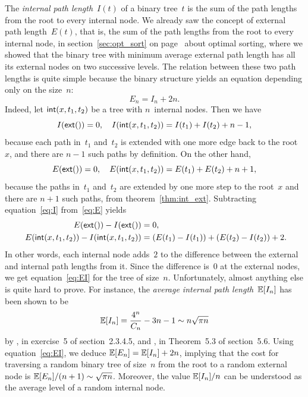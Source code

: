 The \emph{internal path length}~\(I(t)\) of a binary tree~\(t\) is the sum of the path lengths
from the root to every internal node. We already saw the concept of
external path length~\(E(t)\),
that is, the sum of the path lengths from the root to every internal
node, in section~\ref{sec:opt_sort} on page~\pageref{sec:opt_sort}
about optimal sorting, where we showed that the binary tree with
minimum average external path length has all its external nodes on two
successive levels. The relation between these two path lengths is
quite simple because the binary structure yields an equation depending
only on the size~\(n\):
\begin{equation}
E_n = I_n + 2n.\label{eq:EI}
\end{equation}
Indeed, let \(\textsf{int}(x,t_1,t_2)\) be a tree with \(n\)~internal
nodes. Then we have
\begin{equation}
  I(\textsf{ext}()) = 0,\quad
  I(\textsf{int}(x,t_1,t_2)) = I(t_1) + I(t_2) + n - 1,
\label{eq:I}
\end{equation}
because each path in~\(t_1\) and~\(t_2\) is extended with one more
edge back to the root~\(x\), and there are \(n-1\) such paths by
definition. On the other hand,
\begin{equation}
  E(\textsf{ext}()) = 0,\quad
  E(\textsf{int}(x,t_1,t_2)) = E(t_1) + E(t_2) + n + 1,
\label{eq:E}
\end{equation}
because the paths in~\(t_1\) and~\(t_2\) are extended by one more step
to the root~\(x\) and there are \(n+1\) such paths, from
theorem~\vref{thm:int_ext}. Subtracting equation~\eqref{eq:I}
from~\eqref{eq:E} yields
\begin{align*}
  E(\textsf{ext}()) - I(\textsf{ext}()) &= 0,\\
  E(\textsf{int}(x,t_1,t_2)) - I(\textsf{int}(x,t_1,t_2))
  &= (E(t_1) - I(t_1)) + (E(t_2) - I(t_2)) + 2.\!\!
\end{align*}
In other words, each internal node adds~\(2\) to the difference
between the external and internal path lengths from it. Since the
difference is~\(0\) at the external nodes, we get
equation~\eqref{eq:EI} for the tree of size~\(n\). Unfortunately,
almost anything else is quite hard to prove. For instance, the
\emph{average internal path length}~\(\mathbb{E}[{I_n}]\) has been shown to be
\begin{equation*}
\mathbb{E}[{I_n}]  = \frac{4^n}{C_n} - 3n - 1 \sim n \sqrt{\pi n}
\end{equation*}
by \cite{Knuth_1997}, in exercise~5 of section~2.3.4.5,
and \cite{SedgewickFlajolet_1996}, in Theorem~5.3 of section~5.6.
Using equation~\eqref{eq:EI}, we deduce \(\mathbb{E}[{E_n}] =
\mathbb{E}[{I_n}] + 2n\), implying that the cost for traversing a random
binary tree of size~\(n\) from the root to a random external node is
\(\mathbb{E}[{E_n}]/(n+1) \sim \sqrt{\pi n}\). Moreover, the value
\(\mathbb{E}[{I_n}]/n\) can be understood as the average level of a
random internal node.


